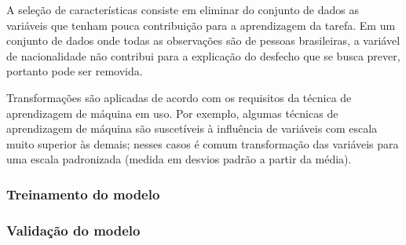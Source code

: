 A seleção de características consiste em eliminar do conjunto de dados as variáveis que tenham pouca contribuição para a aprendizagem da tarefa.
Em um conjunto de dados onde todas as observações são de pessoas brasileiras, a variável de nacionalidade não contribui para a explicação do desfecho
que se busca prever, portanto pode ser removida.

Transformações são aplicadas de acordo com os requisitos da técnica de aprendizagem de máquina em uso. Por exemplo, algumas técnicas de aprendizagem
de máquina são suscetíveis à influência de variáveis com escala muito superior às demais; nesses casos é comum transformação das variáveis para uma escala
padronizada (medida em desvios padrão a partir da média).

\subsubsection{Treinamento do modelo}
\subsubsection{Validação do modelo}

